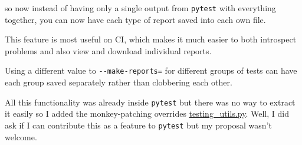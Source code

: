 \documentclass[
]{report}
\begin{document}
so now instead of having only a single output from \texttt{pytest} with
everything together, you can now have each type of report saved into
each own file.

This feature is most useful on CI, which makes it much easier to both
introspect problems and also view and download individual reports.

Using a different value to \texttt{-\/-make-reports=} for different
groups of tests can have each group saved separately rather than
clobbering each other.

All this functionality was already inside \texttt{pytest} but there was
no way to extract it easily so I added the monkey-patching overrides
\url{testing_utils.py}. Well, I did ask if I can contribute this as a
feature to \texttt{pytest} but my proposal wasn't welcome.
\end{document}
